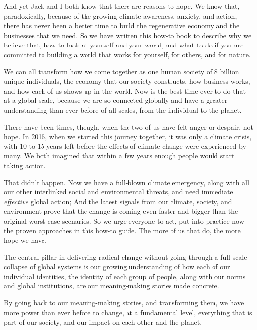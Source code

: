 And yet Jack and I both know that there are reasons to hope. We know that, paradoxically, because of the growing climate awareness, anxiety, and action, there has never been a better time to build the regenerative economy and the businesses that we need. So we have written this how-to book to describe why we believe that, how to look at yourself and your world, and what to do if you are committed to building a world that works for yourself, for others, and for nature. 


We can all transform how we come together as one human society of 8 billion unique individuals, the economy that our society constructs, how business works, and how each of us shows up in the world. Now is the best time ever to do that at a global scale, because we are so connected globally and have a greater understanding than ever before of all scales, from the individual to the planet. 


There have been times, though, when the two of us have felt anger or despair, not hope. In 2015, when we started this journey together, it was only a climate crisis, with 10 to 15 years left before the effects of climate change were experienced by many. We both imagined that within a few years enough people would start taking action. 


That didn't happen. Now we have a full-blown climate emergency, along with all our other interlinked social and environmental threats, and need immediate \emph{effective} global action; And the latest signals from our climate, society, and environment prove that the change is coming even faster and bigger than the original worst-case scenarios. So we urge everyone to act, put into practice now the proven approaches in this how-to guide. The more of us that do, the more hope we have. 


\begin{longstoryblock}
The central pillar in delivering radical change without going through a full-scale collapse of global systems is our growing understanding of how each of our individual identities, the identity of each group of people, along with our norms and global institutions, are our meaning-making stories made concrete.
\end{longstoryblock}


By going back to our meaning-making stories, and transforming them, we have more power than ever before to change, at a fundamental level, everything that is part of our society, and our impact on each other and the planet.


